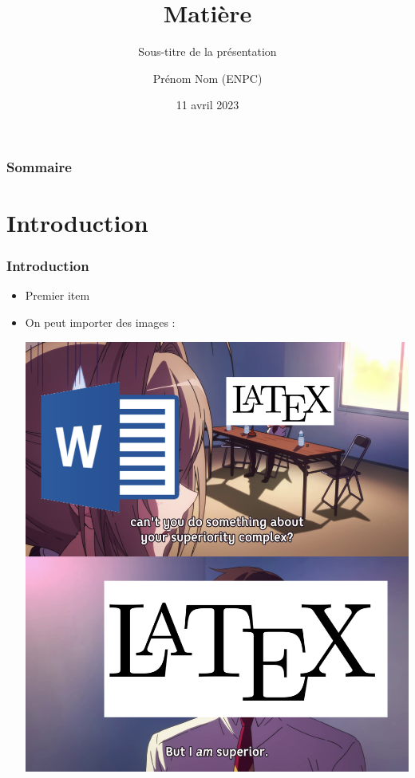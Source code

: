 \documentclass{beamer}
\title{Matière} %
\subtitle{Sous-titre de la présentation} %
\author{Prénom Nom (ENPC)}
\date{11 avril 2023}
\begin{document}
    \begin{frame}
        
        \titlepage
    \end{frame}

    \begin{frame}
        \frametitle{Sommaire}
        \setcounter{tocdepth}{1}
        \tableofcontents
    \end{frame}
    \section{Introduction}
    \begin{frame}
        \frametitle{Introduction}
        \begin{itemize}
            \item Premier item
            \item On peut importer des images : \begin{center}{\includegraphics[height=0.5\paperheight]{assets/image1.png}}\end{center}
        \end{itemize}
    \end{frame}
\end{document}
